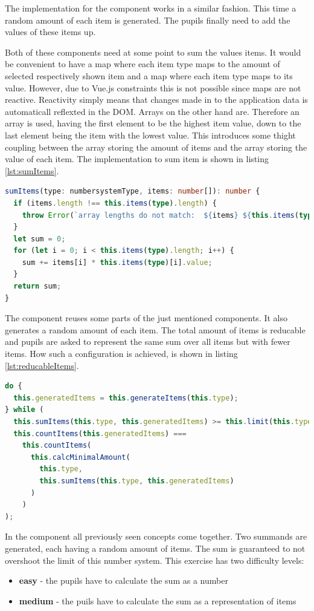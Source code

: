 The implementation for the  component works in a similar fashion. This time a random amount of each item is generated. 
The pupils finally need to add the values of these items up.

Both of these components need at some point to sum the values items. It would be convenient to have a map where each item type maps to the amount of selected respectively shown item and a map where each item type maps to its value. However, due to Vue.js constraints this is not possible since maps are not reactive. Reactivity simply means that changes made in to the application data is automaticall reflexted in the DOM.
Arrays on the other hand are. Therefore an array is used, having the first element to be the highest item value, down to the last element being the item with the lowest value. This introduces some thight coupling between the array storing the amount of items and the array storing the value of each item. The implementation to sum item is shown in listing \ref{lst:sumItems}.

\begin{lstlisting}[language=TypeScript,caption={Sum up items},label={lst:sumItems}]
sumItems(type: numbersystemType, items: number[]): number {
  if (items.length !== this.items(type).length) {
    throw Error(`array lengths do not match:  ${items} ${this.items(type)}`);
  }
  let sum = 0;
  for (let i = 0; i < this.items(type).length; i++) {
    sum += items[i] * this.items(type)[i].value;
  }
  return sum;
}
\end{lstlisting}

The  component reuses some parts of the just mentioned components. It also generates a random amount of each item. The total amount of items is reducable and pupils are asked to represent the same sum over all items but with fewer items. How such a configuration is achieved, is shown in listing \ref{lst:reducableItems}.

\begin{lstlisting}[language=TypeScript,caption={Generate a reducable item configuration},label={lst:reducableItems}]
do {
  this.generatedItems = this.generateItems(this.type);
} while (
  this.sumItems(this.type, this.generatedItems) >= this.limit(this.type) ||
  this.countItems(this.generatedItems) ===
    this.countItems(
      this.calcMinimalAmount(
        this.type,
        this.sumItems(this.type, this.generatedItems)
      )
    )
);
\end{lstlisting}

In the  component all previously seen concepts come together. Two summands are generated, each having a random amount of items. The sum is guaranteed to not overshoot the limit of this number system. This exercise has two difficulty levels:

\begin{itemize}
  \item \textbf{easy} - the pupils have to calculate the sum as a number 
  \item \textbf{medium} - the puils have to calculate the sum as a representation of items
\end{itemize}
